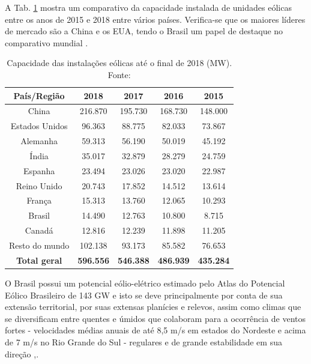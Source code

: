 A Tab. \ref{tab:capacidade-instalada} mostra um comparativo da capacidade instalada de unidades eólicas entre os anos de 2015 e 2018 entre vários países.
Verifica-se que os maiores líderes de mercado são a China e os EUA, tendo o Brasil um papel de destaque no comparativo mundial \cite{WEI}.

\begin{table}[h]
	\centering
	\caption{Capacidade das instalações eólicas até o final de 2018 (MW). Fonte: \cite{WEI}}
	\label{tab:capacidade-instalada}
	
	\begin{tabular}{ccccc}
		\toprule
		\textbf{País/Região} & \textbf{2018} & \textbf{2017} & \textbf{2016} & \textbf{2015}\\
		\midrule
		China & 216.870 & 195.730 & 168.730 & 148.000 \\
		Estados Unidos & 96.363 & 88.775 & 82.033 & 73.867 \\
		Alemanha & 59.313 & 56.190 & 50.019 & 45.192 \\
		Índia & 35.017 & 32.879 & 28.279 & 24.759 \\
		Espanha & 23.494 & 23.026 & 23.020 & 22.987 \\
		Reino Unido & 20.743 & 17.852 & 14.512 & 13.614 \\
		França & 15.313 & 13.760 & 12.065 & 10.293 \\
        Brasil & 14.490 & 12.763 & 10.800 & 8.715 \\
        Canadá & 12.816 & 12.239 & 11.898 & 11.205 \\
        Resto do mundo & 102.138 & 93.173 & 85.582 & 76.653 \\
        \textbf{Total geral} & \textbf{596.556} & \textbf{546.388} & \textbf{486.939} & \textbf{435.284} \\
		\bottomrule
	\end{tabular}
\end{table}


O Brasil possui um potencial eólio-elétrico estimado 
pelo Atlas do Potencial Eólico Brasileiro de 143 GW e isto se deve principalmente
por conta de sua extensão territorial, por suas extensas planícies e relevos, 
assim como climas que se diversificam entre quentes e úmidos que colaboram para a ocorrência 
de ventos fortes - velocidades médias anuais de até 8,5 m/s em estados do Nordeste e 
acima de 7 m/s no Rio Grande do Sul - 
regulares e de grande estabilidade em sua direção \cite{Pinto2019},.

